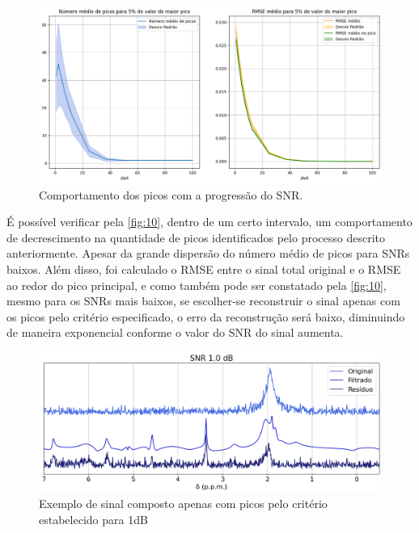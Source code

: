 \documentclass[12pt]{article}
\begin{document}
\begin{figure} [H]
    \centering
    \includegraphics[scale=0.5]{picos.png}
    \caption{Comportamento dos picos com a progressão do SNR.}
    \label{fig:10}
\end{figure}
 
É possível verificar pela \autoref{fig:10}, dentro de um certo intervalo, um comportamento de decrescimento na quantidade de picos identificados pelo processo descrito 
anteriormente. Apesar da grande dispersão do número médio de picos para SNRs baixos. Além disso, foi calculado o RMSE entre o sinal total original e o RMSE ao redor do 
pico principal, e como também pode ser constatado pela \autoref{fig:10}, mesmo para os SNRs mais baixos, se escolher-se reconstruir o sinal apenas com os picos pelo critério 
especificado, o erro da reconstrução será baixo, diminuindo de maneira exponencial conforme o valor do SNR do sinal aumenta.

\begin{figure} [H]
    \centering
    \includegraphics[scale=0.5]{original-filtrado-residuo-1.png}
    \caption{Exemplo de sinal composto apenas com picos pelo critério estabelecido para 1dB}
    \label{fig:11}
\end{figure}
\end{document}
